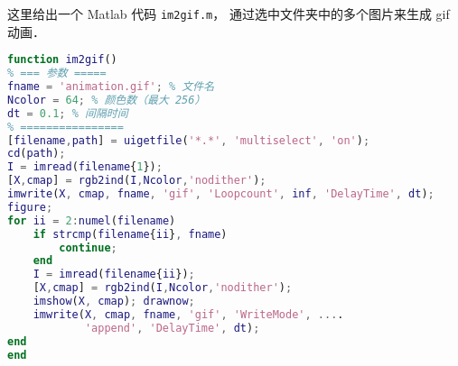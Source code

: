 
这里给出一个 Matlab 代码 \verb|im2gif.m|， 通过选中文件夹中的多个图片来生成 gif 动画．
\begin{lstlisting}[language=matlab, caption=im2gif.m]
function im2gif()
% === 参数 =====
fname = 'animation.gif'; % 文件名
Ncolor = 64; % 颜色数（最大 256）
dt = 0.1; % 间隔时间
% ================
[filename,path] = uigetfile('*.*', 'multiselect', 'on');
cd(path);
I = imread(filename{1});
[X,cmap] = rgb2ind(I,Ncolor,'nodither');
imwrite(X, cmap, fname, 'gif', 'Loopcount', inf, 'DelayTime', dt);
figure;
for ii = 2:numel(filename)
    if strcmp(filename{ii}, fname)
        continue;
    end
    I = imread(filename{ii});
    [X,cmap] = rgb2ind(I,Ncolor,'nodither');
    imshow(X, cmap); drawnow;
    imwrite(X, cmap, fname, 'gif', 'WriteMode', ....
            'append', 'DelayTime', dt);
end
end
\end{lstlisting}
